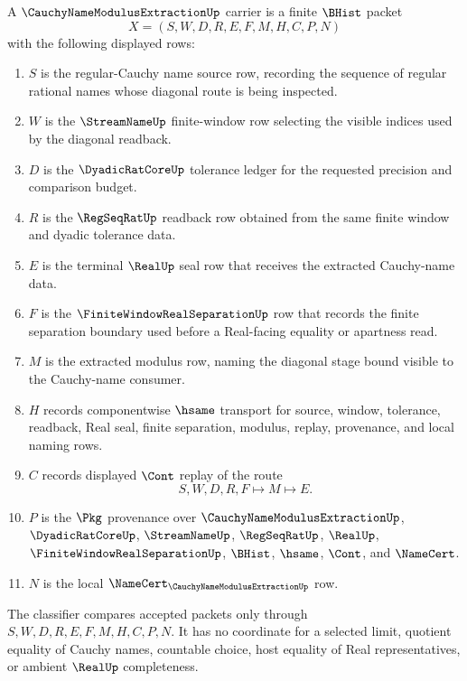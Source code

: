 \begin{theorem}
\label{thm:cauchy-name-modulus-extraction-vision-carrier}
A $\CauchyNameModulusExtractionUp$ carrier is a finite $\BHist$ packet
$$
X=(S,W,D,R,E,F,M,H,C,P,N)
$$
with the following displayed rows:
\begin{enumerate}
\item $S$ is the regular-Cauchy name source row, recording the sequence of regular rational names whose diagonal route is being inspected.
\item $W$ is the $\StreamNameUp$ finite-window row selecting the visible indices used by the diagonal readback.
\item $D$ is the $\DyadicRatCoreUp$ tolerance ledger for the requested precision and comparison budget.
\item $R$ is the $\RegSeqRatUp$ readback row obtained from the same finite window and dyadic tolerance data.
\item $E$ is the terminal $\RealUp$ seal row that receives the extracted Cauchy-name data.
\item $F$ is the $\FiniteWindowRealSeparationUp$ row that records the finite separation boundary used before a Real-facing equality or apartness read.
\item $M$ is the extracted modulus row, naming the diagonal stage bound visible to the Cauchy-name consumer.
\item $H$ records componentwise $\hsame$ transport for source, window, tolerance, readback, Real seal, finite separation, modulus, replay, provenance, and local naming rows.
\item $C$ records displayed $\Cont$ replay of the route
$$
S,W,D,R,F \longmapsto M \longmapsto E .
$$
\item $P$ is the $\Pkg$ provenance over $\CauchyNameModulusExtractionUp$, $\DyadicRatCoreUp$, $\StreamNameUp$, $\RegSeqRatUp$, $\RealUp$, $\FiniteWindowRealSeparationUp$, $\BHist$, $\hsame$, $\Cont$, and $\NameCert$.
\item $N$ is the local $\NameCert_{\CauchyNameModulusExtractionUp}$ row.
\end{enumerate}
The classifier compares accepted packets only through $S,W,D,R,E,F,M,H,C,P,N$. It has no coordinate for a selected limit, quotient equality of Cauchy names, countable choice, host equality of Real representatives, or ambient $\RealUp$ completeness.
\end{theorem}

